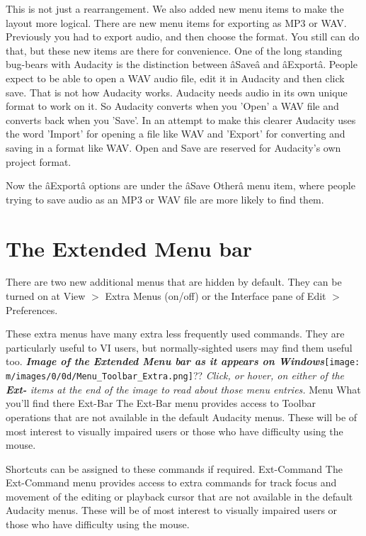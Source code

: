 This is not just a rearrangement.  We also added new menu items to make the layout more logical.  There are new menu items for exporting as MP3 or WAV. Previously you had to export audio, and then choose the format. You still can do that, but these new items are there for convenience.
One of the long standing bug-bears with Audacity is the distinction between \^aSave\^a and \^aExport\^a. People expect to be able to open a WAV audio file, edit it in Audacity and then click save. That is not how Audacity works. Audacity needs audio in its own unique format to work on it. So Audacity converts when you 'Open' a WAV file and converts back when you 'Save'. In an attempt to make this clearer Audacity uses the word 'Import' for opening a file like WAV and 'Export' for converting and saving in a format like WAV. Open and Save are reserved for Audacity's own project format.

Now the \^aExport\^a options are under the \^aSave Other\^a menu item, where people trying to save audio as an MP3 or WAV file are more likely to find them. 


\section{The Extended Menu bar}


There are two new additional menus that are hidden by default.  They can be turned on at View \mbox{$>$} Extra Menus (on/off) or the Interface pane of Edit \mbox{$>$} Preferences.

These extra menus have many extra less frequently used commands.  They are particularly useful to VI users, but normally-sighted users may find them useful too.
\textit{\textbf{Image of the Extended Menu bar as it appears on Windows}}\texttt{[image: m/images/0/0d/Menu\_Toolbar\_Extra.png]}??
\textit{Click, or hover, on either of the \textbf{Ext-} items at the end of the image to read about those menu entries.}
Menu
What you'll find there
Ext-Bar
The Ext-Bar menu provides access to Toolbar operations that are not available in the default Audacity menus. These will be of most interest to visually impaired users or those who have difficulty using the mouse.

Shortcuts can be assigned to these commands if required.
Ext-Command
The Ext-Command menu provides access to extra commands for track focus and movement of the editing or playback cursor that are not available in the default Audacity menus. These will be of most interest to visually impaired users or those who have difficulty using the mouse.

